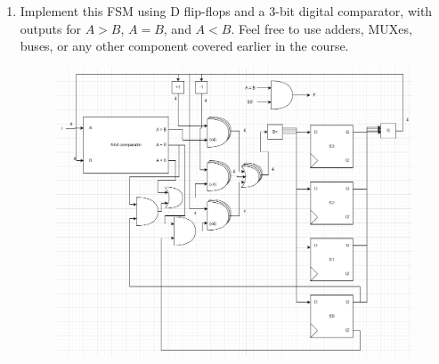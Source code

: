 \documentclass{article}
\begin{document}
\begin{enumerate}[label=\alph*.]
\begin{tikzpicture}
\end{tikzpicture}
\newpage
\item Implement this FSM using D flip-flops and a 3-bit digital comparator, with outputs for $A > B$, $A = B$, and $A < B$. Feel free to use adders, MUXes, buses, or any other component covered earlier in the course.
\begin{figure}[!h]
    \centering
    \includegraphics[width=1\textwidth]{figures/fsm2e-solution.png}
\end{figure}
\end{enumerate}

\newpage
\end{document}
